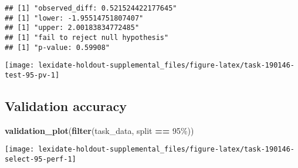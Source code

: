 \documentclass[
]{book}
\newenvironment{Shaded}{\begin{snugshade}}{\end{snugshade}}
\newcommand{\AttributeTok}[1]{\textcolor[rgb]{0.13,0.29,0.53}{#1}}
\newcommand{\DecValTok}[1]{\textcolor[rgb]{0.00,0.00,0.81}{#1}}
\newcommand{\FunctionTok}[1]{\textcolor[rgb]{0.13,0.29,0.53}{\textbf{#1}}}
\newcommand{\NormalTok}[1]{#1}
\newcommand{\OtherTok}[1]{\textcolor[rgb]{0.56,0.35,0.01}{#1}}
\newcommand{\SpecialCharTok}[1]{\textcolor[rgb]{0.81,0.36,0.00}{\textbf{#1}}}
\newcommand{\StringTok}[1]{\textcolor[rgb]{0.31,0.60,0.02}{#1}}
\begin{document}
\begin{Shaded}
\end{Shaded}

\begin{verbatim}
## [1] "observed_diff: 0.521524422177645"
## [1] "lower: -1.95514751807407"
## [1] "upper: 2.00183834772485"
## [1] "fail to reject null hypothesis"
## [1] "p-value: 0.59908"
\end{verbatim}

\texttt{[image: lexidate-holdout-supplemental\_files/figure-latex/task-190146-test-95-pv-1]}

\hypertarget{validation-accuracy-19}{%
\subsection{Validation accuracy}\label{validation-accuracy-19}}

\begin{Shaded}
\begin{Highlighting}[]
\FunctionTok{validation\_plot}\NormalTok{(}\FunctionTok{filter}\NormalTok{(task\_data, split }\SpecialCharTok{==} \StringTok{\textquotesingle{}95\%\textquotesingle{}}\NormalTok{))}
\end{Highlighting}
\end{Shaded}

\texttt{[image: lexidate-holdout-supplemental\_files/figure-latex/task-190146-select-95-perf-1]}
\end{document}
